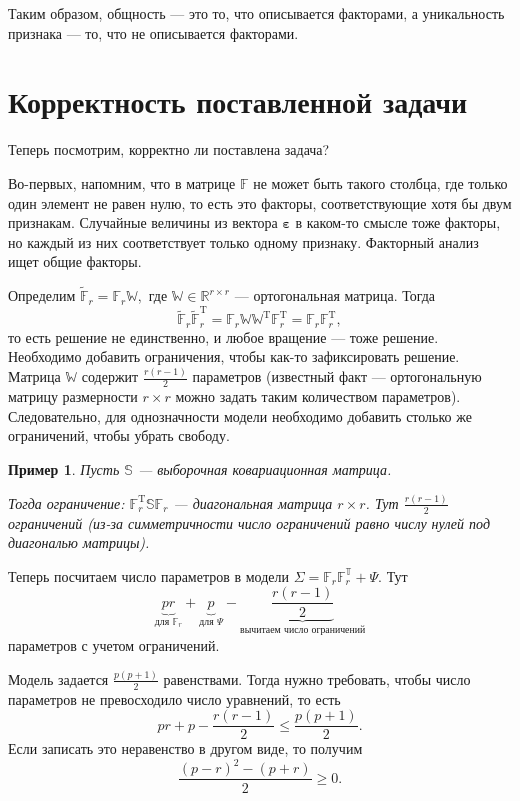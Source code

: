 \documentclass[specialist, 12pt,
subf, %
href, colorlinks=true,
substylefile = spbu.rtx,
]{disser}
\newtheorem{example}{Пример}
\begin{document}
Таким образом, общность --- это то, что описывается факторами, а уникальность признака --- то, что не описывается факторами.

\section{Корректность поставленной задачи}
Теперь посмотрим, корректно ли поставлена задача?

Во-первых, напомним, что в матрице $\mathbb{F}$ не может быть такого столбца, где только один элемент не равен нулю, то есть это факторы, соответствующие хотя бы двум признакам. Случайные величины из вектора $\bm\varepsilon$ в каком-то смысле тоже факторы, но каждый из них соответствует только одному признаку. Факторный анализ ищет общие факторы.

Определим $\widetilde{\mathbb{F}}_r=\mathbb{F}_r\mathbb{W},$ где $\mathbb{W} \in \mathbb{R}^{r\times r}$ --- ортогональная матрица. Тогда
\begin{equation*} \widetilde{\mathbb{F}}_r\widetilde{\mathbb{F}}_r^\mathrm{T}=\mathbb{F}_r\mathbb{W}\mathbb{W}^\mathrm{T}\mathbb{F}_r^\mathrm{T}=\mathbb{F}_r\mathbb{F}_r^\mathrm{T},
\end{equation*}
то есть решение не единственно, и любое вращение --- тоже решение. Необходимо добавить ограничения, чтобы как-то зафиксировать решение. Матрица $\mathbb{W}$ содержит $\frac{r(r-1)}{2}$ параметров (известный факт --- ортогональную матрицу размерности $r\times r$ можно задать таким количеством параметров). Следовательно, для однозначности модели необходимо добавить столько же ограничений, чтобы убрать свободу.
\begin{example}
	Пусть $\mathbb{S}$ --- выборочная ковариационная матрица.
	
	 Тогда ограничение: $\mathbb{F}_r^\mathrm{T}\mathbb{S}\mathbb{F}_r$ --- диагональная матрица $r\times r$. Тут $\frac{r(r-1)}{2}$ ограничений (из-за симметричности число ограничений равно числу нулей под диагональю матрицы).
\end{example}

Теперь посчитаем число параметров в модели $\Sigma=\mathbb{F}_r\mathbb{F}_r^\mathbb{T}+\Psi$. Тут
\begin{equation*}
\underbrace{pr}_{\text{для }\mathbb{F}_r}+\underbrace{p}_{\text{для }\Psi}-\underbrace{\frac{r(r-1)}{2}}_{\text{вычитаем число ограничений}}
\end{equation*}
параметров с учетом ограничений.

Модель задается $\frac{p(p+1)}{2}$ равенствами. Тогда нужно требовать, чтобы число параметров не превосходило число уравнений, то есть
\begin{equation*}
pr+p-\frac{r(r-1)}{2}\le \frac{p(p+1)}{2}.
\end{equation*}
Если записать это неравенство в другом виде, то получим
\begin{equation*}
\frac{(p-r)^2-(p+r)}{2}\ge 0.
\end{equation*}
\end{document}
